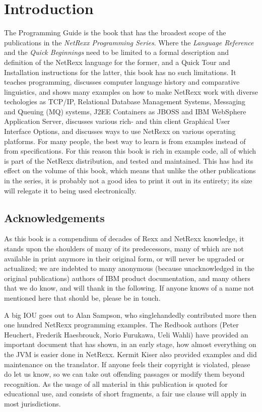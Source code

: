 \chapter{Introduction}
The Programming Guide is the book that has the broadest scope of the publications in the \emph{NetRexx Programming Series}. Where the \emph{Language Reference} and the \emph{Quick Beginnings} need to be limited to a formal description and definition of the NetRexx language for the former, and a Quick Tour and Installation instructions for the latter, this book has no such limitations. It teaches programming, discusses computer language history and comparative linguistics, and shows many examples on how to make NetRexx work with diverse techologies as TCP/IP, Relational Database Management Systems, Messaging and Queuing (MQ\textsuperscript{\texttrademark}) systems, J2EE Containers as JBOSS\textsuperscript{\texttrademark} and IBM WebSphere Application Server\textsuperscript{\texttrademark}, discusses various rich- and thin client Graphical User Interface Options, and discusses ways to use NetRexx on various operating platforms. For many people, the best way to learn is from examples instead of from specifications. For this reason this book is rich in example code, all of which is part of the NetRexx distribution, and tested and maintained. This has had its effect on the volume of this book, which means that unlike the other publications in the series, it is probably not a good idea to print it out in its entirety; its size will relegate it to being used electronically.
\section*{Acknowledgements}
As this book is a compendium of decades of Rexx and NetRexx knowledge, it stands upon the shoulders of many of its predecessors, many of which are not available in print anymore in their original form, or will never be upgraded or actualized; we are indebted to many anonymous (because unacknowledged in the original publications) authors of IBM product documentation, and many others that we do know, and will thank in the following. If anyone knows of a name not mentioned here that should be, please be in touch. 

A big IOU goes out to Alan Sampson, who singlehandedly contributed more then one hundred NetRexx programming examples. The Redbook authors (Peter Heuchert, Frederik Haesbrouck, Norio Furukawa, Ueli Wahli) have provided an important document that has shown, in an early stage, how almost everything on the JVM is easier done in NetRexx. Kermit Kiser also provided examples and did maintenance on the translator. If anyone feels their copyright is violated, please do let us know, so we can take out offending passages or modify them beyond recognition. As the usage of all material in this publication is quoted for educational use, and consists of short fragments, a fair use clause will apply in most jurisdictions.

